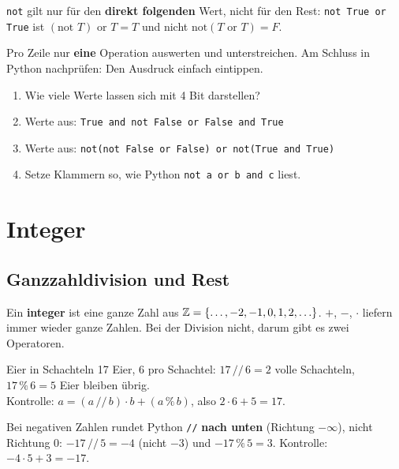 \begin{fehler}
  \texttt{not} gilt nur für den \textbf{direkt folgenden} Wert, nicht für den Rest:
  \texttt{not True or True} ist $(\text{not } T) \text{ or } T = T$ und nicht
  $\text{not}(T \text{ or } T) = F$.
\end{fehler}

\begin{pruefung}
  Pro Zeile nur \textbf{eine} Operation auswerten und unterstreichen. Am Schluss
  in Python nachprüfen: Den Ausdruck einfach eintippen.
\end{pruefung}

\begin{minicheck}
  \begin{enumerate}[label=\textbf{F\arabic*}, ref=F\arabic*, series=fragen01]
    \item Wie viele Werte lassen sich mit 4 Bit darstellen?
    \item Werte aus: \texttt{True and not False or False and True}
    \item Werte aus: \texttt{not(not False or False) or not(True and True)}
    \item Setze Klammern so, wie Python \texttt{not a or b and c} liest.
  \end{enumerate}
\end{minicheck}

\section{Integer}

\subsection*{Ganzzahldivision und Rest}
Ein \textbf{integer} ist eine ganze Zahl aus $\mathbb{Z} = \{\ldots, -2, -1, 0, 1, 2, \ldots\}$.
$+$, $-$, $\cdot$ liefern immer wieder ganze Zahlen. Bei der Division nicht, darum gibt
es zwei Operatoren.

\begin{beispiel}{Eier in Schachteln}
  17 Eier, 6 pro Schachtel:\quad
  $17 \,/\!/\, 6 = 2$ volle Schachteln, \quad $17 \,\%\, 6 = 5$ Eier bleiben übrig.\\
  Kontrolle: $a = (a \,/\!/\, b)\cdot b + (a \,\%\, b)$, also $2 \cdot 6 + 5 = 17$.
\end{beispiel}

\begin{fehler}
  Bei negativen Zahlen rundet Python \texttt{//} \textbf{nach unten} (Richtung $-\infty$),
  nicht Richtung 0: $-17 \,/\!/\, 5 = -4$ (nicht $-3$) und $-17 \,\%\, 5 = 3$.
  Kontrolle: $-4 \cdot 5 + 3 = -17$.
\end{fehler}

